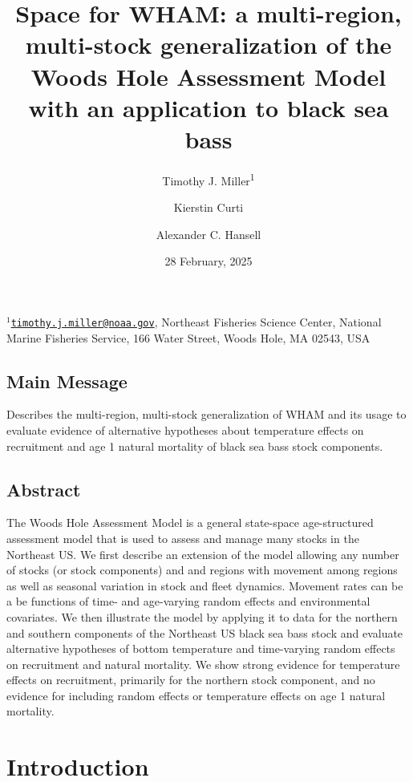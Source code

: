 \documentclass[
]{article}
\title{Space for WHAM: a multi-region, multi-stock generalization of the
Woods Hole Assessment Model with an application to black sea bass}
\author{Timothy J. Miller\textsuperscript{1} \and Kierstin
Curti \and Alexander C. Hansell}
\date{28 February, 2025}
\begin{document}
\maketitle

\(^1\)\href{mailto:timothy.j.miller@noaa.gov}{\nolinkurl{timothy.j.miller@noaa.gov}},
Northeast Fisheries Science Center, National Marine Fisheries Service,
166 Water Street, Woods Hole, MA 02543, USA\\

\pagebreak

\hypertarget{main-message}{%
\subsection*{Main Message}\label{main-message}}

Describes the multi-region, multi-stock generalization of WHAM and its
usage to evaluate evidence of alternative hypotheses about temperature
effects on recruitment and age 1 natural mortality of black sea bass
stock components.

\hypertarget{abstract}{%
\subsection*{Abstract}\label{abstract}}

The Woods Hole Assessment Model is a general state-space age-structured
assessment model that is used to assess and manage many stocks in the
Northeast US. We first describe an extension of the model allowing any
number of stocks (or stock components) and and regions with movement
among regions as well as seasonal variation in stock and fleet dynamics.
Movement rates can be a be functions of time- and age-varying random
effects and environmental covariates. We then illustrate the model by
applying it to data for the northern and southern components of the
Northeast US black sea bass stock and evaluate alternative hypotheses of
bottom temperature and time-varying random effects on recruitment and
natural mortality. We show strong evidence for temperature effects on
recruitment, primarily for the northern stock component, and no evidence
for including random effects or temperature effects on age 1 natural
mortality.

\pagebreak

\hypertarget{introduction}{%
\section*{Introduction}\label{introduction}}
\end{document}
